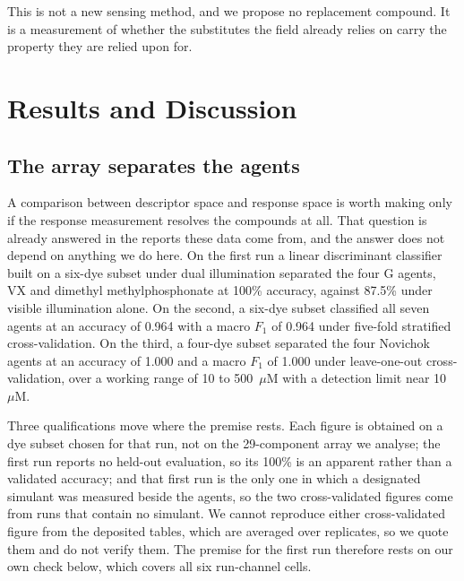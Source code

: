 \documentclass[journal=jacsat,manuscript=article,margin=1in]{achemso}
\begin{document}
This is not a new sensing method, and we propose no replacement compound.
It is a measurement of whether the substitutes the field already relies on
carry the property they are relied upon for.

\section{Results and Discussion}

\subsection{The array separates the agents}
\label{res:premise}

A comparison between descriptor space and response space is worth making
only if the response measurement resolves the compounds at all. That
question is already answered in the reports these data come from, and the
answer does not depend on anything we do here. On the first run a linear
discriminant classifier built on a six-dye subset under dual illumination
separated the four G agents, VX and dimethyl methylphosphonate at 100\%
accuracy, against 87.5\% under visible illumination alone\cite{hazref}. On
the second, a six-dye subset classified all seven agents at an accuracy of
0.964 with a macro $F_1$ of 0.964 under five-fold stratified
cross-validation\cite{multiplexref}. On the third, a four-dye subset
separated the four Novichok agents at an accuracy of 1.000 and a macro
$F_1$ of 1.000 under leave-one-out cross-validation, over a working range
of 10 to 500~$\mu$M with a detection limit near 10~$\mu$M\cite{group3ref}.

Three qualifications move where the premise rests. Each figure is obtained on
a dye subset chosen for that run, not on the 29-component array we analyse;
the first run reports no held-out evaluation, so its 100\% is an apparent
rather than a validated accuracy; and that first run is the only one in which
a designated simulant was measured beside the agents, so the two
cross-validated figures come from runs that contain no simulant. We cannot
reproduce either cross-validated figure from the deposited tables, which are
averaged over replicates, so we quote them and do not verify them. The
premise for the first run therefore rests on our own check below, which
covers all six run-channel cells.
\end{document}
